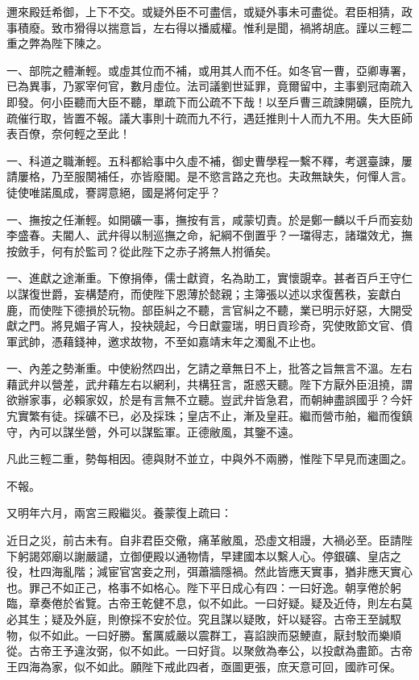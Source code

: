 \begin{pinyinscope}
邇來殿廷希御，上下不交。或疑外臣不可盡信，或疑外事未可盡從。君臣相猜，政事積廢。致市猾得以揣意旨，左右得以播威權。惟利是聞，禍將胡底。謹以三輕二重之弊為陛下陳之。

一、部院之體漸輕。或虛其位而不補，或用其人而不任。如冬官一曹，亞卿專署，已為異事，乃冢宰何官，數月虛位。法司議劉世延罪，竟爾留中，主事劉冠南疏入即發。何小臣聽而大臣不聽，單疏下而公疏不下哉！以至戶曹三疏諫開礦，臣院九疏催行取，皆置不報。議大事則十疏而九不行，遇廷推則十人而九不用。失大臣師表百僚，奈何輕之至此！

一、科道之職漸輕。五科都給事中久虛不補，御史曹學程一繫不釋，考選臺諫，屢請屢格，乃至服闋補任，亦皆廢閣。是不慾言路之充也。夫政無缺失，何憚人言。徒使唯諾風成，謇諤意絕，國是將何定乎？

一、撫按之任漸輕。如開礦一事，撫按有言，咸蒙切責。於是鄭一麟以千戶而妄劾李盛春。夫閽人、武弁得以制巡撫之命，紀綱不倒置乎？一璫得志，諸璫效尤，撫按斂手，何有於監司？從此陛下之赤子將無人拊循矣。

一、進獻之途漸重。下僚捐俸，儒士獻資，名為助工，實懷覬幸。甚者百戶王守仁以謀復世爵，妄構楚府，而使陛下恩薄於懿親；主簿張以述以求復舊秩，妄獻白鹿，而使陛下德損於玩物。部臣糾之不聽，言官糾之不聽，業已明示好惡，大開受獻之門。將見媚子宵人，投袂競起，今日獻靈瑞，明日貢珍奇，究使敗節文官、僨軍武帥，憑藉錢神，邀求故物，不至如嘉靖末年之濁亂不止也。

一、內差之勢漸重。中使紛然四出，乞請之章無日不上，批答之旨無言不溫。左右藉武弁以營差，武弁藉左右以網利，共構狂言，誑惑天聽。陛下方厭外臣沮撓，謂欲辦家事，必賴家奴，於是有言無不立聽。豈武弁皆急君，而朝紳盡誤國乎？今奸宄實繁有徒。採礦不已，必及採珠；皇店不止，漸及皇莊。繼而營市舶，繼而復鎮守，內可以謀坐營，外可以謀監軍。正德敝風，其鑒不遠。

凡此三輕二重，勢每相因。德與財不並立，中與外不兩勝，惟陛下早見而速圖之。

不報。

又明年六月，兩宮三殿繼災。養蒙復上疏曰：

近日之災，前古未有。自非君臣交儆，痛革敝風，恐虛文相謾，大禍必至。臣請陛下躬謁郊廟以謝嚴譴，立御便殿以通物情，早建國本以繫人心。停銀礦、皇店之役，杜四海亂階；減宦官宮妾之刑，弭蕭牆隱禍。然此皆應天實事，猶非應天實心也。罪己不如正己，格事不如格心。陛下平日成心有四：一曰好逸。朝享倦於躬臨，章奏倦於省覽。古帝王乾健不息，似不如此。一曰好疑。疑及近侍，則左右莫必其生；疑及外庭，則僚採不安於位。究且謀以疑敗，奸以疑容。古帝王至誠馭物，似不如此。一曰好勝。奮厲威嚴以震群工，喜諂諛而惡鯁直，厭封駮而樂順從。古帝王予違汝弼，似不如此。一曰好貨。以聚斂為奉公，以投獻為盡節。古帝王四海為家，似不如此。願陛下戒此四者，亟圖更張，庶天意可回，國祚可保。


\end{pinyinscope}

